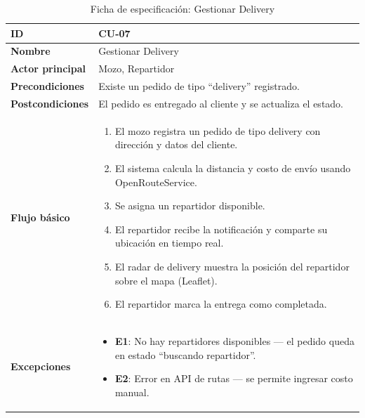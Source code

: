 \documentclass[12pt, a4paper]{article}
\begin{document}
\begin{table}[H]
\centering
\caption{Ficha de especificación: Gestionar Delivery}
\begin{tabularx}{\textwidth}{|l|X|}
    \hline
    \textbf{ID} & CU-07 \\ \hline
    \textbf{Nombre} & Gestionar Delivery \\ \hline
    \textbf{Actor principal} & Mozo, Repartidor \\ \hline
    \textbf{Precondiciones} & Existe un pedido de tipo ``delivery'' registrado. \\ \hline
    \textbf{Postcondiciones} & El pedido es entregado al cliente y se actualiza el estado. \\ \hline
    \textbf{Flujo básico} &
    \begin{enumerate}[nosep, leftmargin=*]
        \item El mozo registra un pedido de tipo delivery con dirección y datos del cliente.
        \item El sistema calcula la distancia y costo de envío usando OpenRouteService.
        \item Se asigna un repartidor disponible.
        \item El repartidor recibe la notificación y comparte su ubicación en tiempo real.
        \item El radar de delivery muestra la posición del repartidor sobre el mapa (Leaflet).
        \item El repartidor marca la entrega como completada.
    \end{enumerate} \\ \hline
    \textbf{Excepciones} &
    \begin{itemize}[nosep, leftmargin=*]
        \item \textbf{E1}: No hay repartidores disponibles --- el pedido queda en estado ``buscando repartidor''.
        \item \textbf{E2}: Error en API de rutas --- se permite ingresar costo manual.
    \end{itemize} \\ \hline
\end{tabularx}
\end{table}
\end{document}
